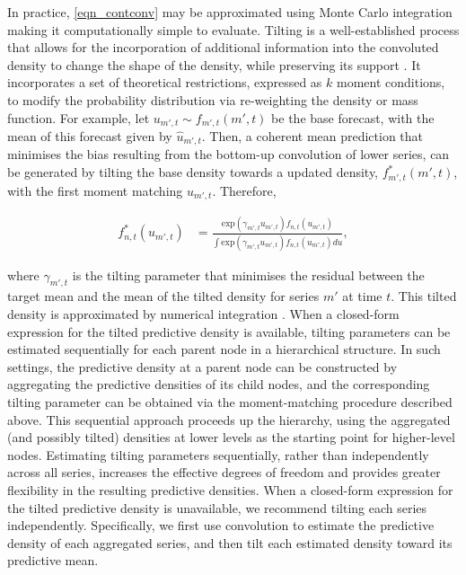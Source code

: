 In practice, \eqref{eqn_contconv} may be approximated using Monte Carlo integration making it computationally simple to evaluate. \newline
Tilting is a well-established process that allows for the incorporation of additional information into the convoluted density to change the shape of the density, while preserving its support \citep{GiacominiRagusa2014, KruegerClarkRavazzolo2017, West2024}. It incorporates a set of theoretical restrictions, expressed as \(k\) moment conditions, to modify the probability distribution via re-weighting the density or mass function. For example, let \(u_{m',t} \sim f_{m', t}(m', t)\) be the base forecast, with the mean of this forecast given by \(\hat{u}_{m',t}\). Then, a coherent mean prediction that minimises the bias resulting from the bottom-up convolution of lower series, can be generated by tilting the base density towards a updated density, \(f^{*}_{m', t}(m', t)\), with the first moment matching \(\hat{u}_{m',t}\). Therefore,

\begin{align}
    f_{n, t}^{*}(u_{m', t}) &= \frac{ \text{exp}(\gamma_{m',t} u_{m',t}) f_{n,t}(u_{m',t})}
    {\int \text{exp}(\gamma_{m',t} u_{m',t}) f_{n,t}(u_{m',t}) du}, 
\end{align}

where \(\gamma_{m',t}\) is the tilting parameter that minimises the residual between the target mean and the mean of the tilted density for series \(m'\) at time \(t\). This tilted density is approximated by numerical integration \citep{BurdenFaires2015}. When a closed-form expression for the tilted predictive density is available, tilting parameters can be estimated sequentially for each parent node in a hierarchical structure. In such settings, the predictive density at a parent node can be constructed by aggregating the predictive densities of its child nodes, and the corresponding tilting parameter can be obtained via the moment-matching procedure described above. This sequential approach proceeds up the hierarchy, using the aggregated (and possibly tilted) densities at lower levels as the starting point for higher-level nodes. Estimating tilting parameters sequentially, rather than independently across all series, increases the effective degrees of freedom and provides greater flexibility in the resulting predictive densities. When a closed-form expression for the tilted predictive density is unavailable, we recommend tilting each series independently. Specifically, we first use convolution to estimate the predictive density of each aggregated series, and then tilt each estimated density toward its predictive mean.

